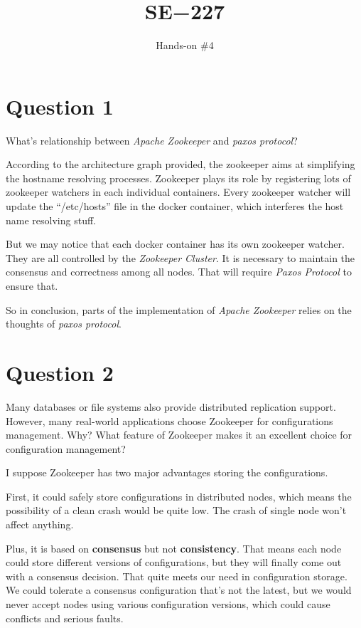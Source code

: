 \documentclass[11pt, oneside]{article}   	%
\title{SE−227}
\author{Hands-on \#4}
\begin{document}
\maketitle

\section*{Question 1} What's relationship between \textit{Apache Zookeeper} and \textit{paxos protocol}?
\newline

According to the architecture graph provided, the zookeeper aims at simplifying the hostname resolving processes. Zookeeper plays its role by registering lots of zookeeper watchers in each individual containers. Every zookeeper watcher will update the ``/etc/hosts'' file in the docker container, which interferes the host name resolving stuff.

But we may notice that each docker container has its own zookeeper watcher. They are all controlled by the \textit{Zookeeper Cluster}. It is necessary to maintain the consensus and correctness among all nodes. That will require \textit{Paxos Protocol} to ensure that.

So in conclusion, parts of the implementation of \textit{Apache Zookeeper} relies on the thoughts of \textit{paxos protocol}.

\section*{Question 2}
Many databases or file systems also provide distributed replication support. However, many real-world applications choose Zookeeper for configurations management. Why? What feature of Zookeeper makes it an excellent choice for configuration management?
\newline

I suppose Zookeeper has two major advantages storing the configurations.

First, it could safely store configurations in distributed nodes, which means the possibility of a clean crash would be quite low. The crash of single node won't affect anything.

Plus, it is based on \textbf{consensus} but not \textbf{consistency}. That means each node could store different versions of configurations, but they will finally come out with a consensus decision. That quite meets our need in configuration storage. We could tolerate a consensus configuration that's not the latest, but we would never accept nodes using various configuration versions, which could cause conflicts and serious faults.
\end{document}
